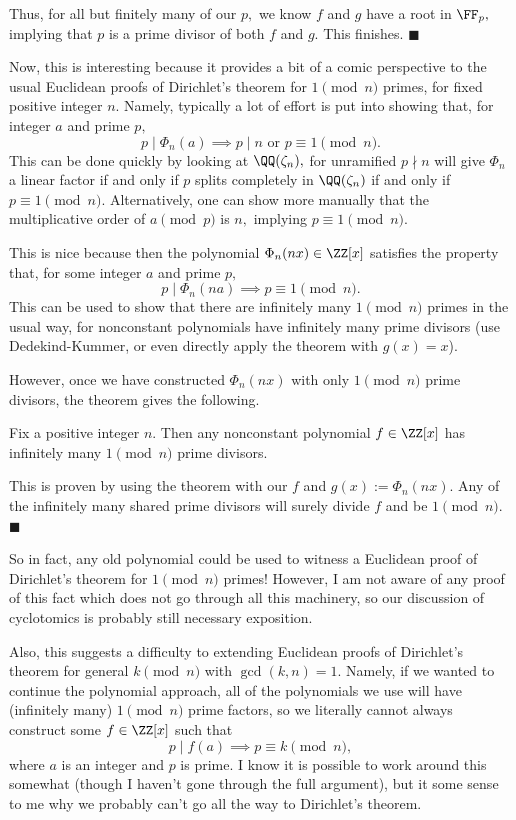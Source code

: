 Thus, for all but finitely many of our $p,$ we know $f$ and $g$ have a root in $\FF_p,$ implying that $p$ is a prime divisor of both $f$ and $g.$ This finishes. $\blacksquare$

Now, this is interesting because it provides a bit of a comic perspective to the usual Euclidean proofs of Dirichlet's theorem for $1\pmod n$ primes, for fixed positive integer $n.$ Namely, typically a lot of effort is put into showing that, for integer $a$ and prime $p,$
\[p\mid\Phi_n(a)\implies p\mid n\text{ or }p\equiv1\pmod n.\]
This can be done quickly by looking at $\QQ(\zeta_n),$ for unramified $p\nmid n$ will give $\Phi_n$ a linear factor if and only if $p$ splits completely in $\QQ(\zeta_n)$ if and only if $p\equiv1\pmod n.$ Alternatively, one can show more manually that the multiplicative order of $a\pmod p$ is $n,$ implying $p\equiv1\pmod n.$

This is nice because then the polynomial $\Phi_n(nx)\in\ZZ[x]$ satisfies the property that, for some integer $a$ and prime $p,$
\[p\mid\Phi_n(na)\implies p\equiv1\pmod n.\]
This can be used to show that there are infinitely many $1\pmod n$ primes in the usual way, for nonconstant polynomials have infinitely many prime divisors (use Dedekind-Kummer, or even directly apply the theorem with $g(x)=x$).

However, once we have constructed $\Phi_n(nx)$ with only $1\pmod n$ prime divisors, the theorem gives the following.
\begin{proposition}
    Fix a positive integer $n.$ Then any nonconstant polynomial $f\in\ZZ[x]$ has infinitely many $1\pmod n$ prime divisors.
\end{proposition}
This is proven by using the theorem with our $f$ and $g(x):=\Phi_n(nx).$ Any of the infinitely many shared prime divisors will surely divide $f$ and be $1\pmod n.$ $\blacksquare$

So in fact, any old polynomial could be used to witness a Euclidean proof of Dirichlet's theorem for $1\pmod n$ primes! However, I am not aware of any proof of this fact which does not go through all this machinery, so our discussion of cyclotomics is probably still necessary exposition.

Also, this suggests a difficulty to extending Euclidean proofs of Dirichlet's theorem for general $k\pmod n$ with $\gcd(k,n)=1.$ Namely, if we wanted to continue the polynomial approach, all of the polynomials we use will have (infinitely many) $1\pmod n$ prime factors, so we literally cannot always construct some $f\in\ZZ[x]$ such that
\[p\mid f(a)\implies p\equiv k\pmod n,\]
where $a$ is an integer and $p$ is prime. I know it is possible to work around this somewhat (though I haven't gone through the full argument), but it some sense to me why we probably can't go all the way to Dirichlet's theorem.

